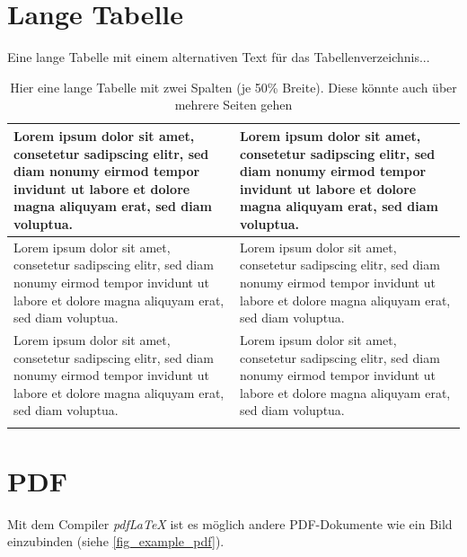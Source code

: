\section{Lange Tabelle}
Eine lange Tabelle mit einem alternativen Text für das Tabellenverzeichnis...
\begin{longtable}{p{0.5\linewidth} p{0.5\linewidth}}
    \hline
    Lorem ipsum dolor sit amet, consetetur sadipscing elitr, sed diam nonumy eirmod tempor invidunt ut labore et dolore magna aliquyam erat, sed diam voluptua. &
    Lorem ipsum dolor sit amet, consetetur sadipscing elitr, sed diam nonumy eirmod tempor invidunt ut labore et dolore magna aliquyam erat, sed diam voluptua. \\
    \hline
    Lorem ipsum dolor sit amet, consetetur sadipscing elitr, sed diam nonumy eirmod tempor invidunt ut labore et dolore magna aliquyam erat, sed diam voluptua. &
    Lorem ipsum dolor sit amet, consetetur sadipscing elitr, sed diam nonumy eirmod tempor invidunt ut labore et dolore magna aliquyam erat, sed diam voluptua. \\
    \hline
    Lorem ipsum dolor sit amet, consetetur sadipscing elitr, sed diam nonumy eirmod tempor invidunt ut labore et dolore magna aliquyam erat, sed diam voluptua. &
    Lorem ipsum dolor sit amet, consetetur sadipscing elitr, sed diam nonumy eirmod tempor invidunt ut labore et dolore magna aliquyam erat, sed diam voluptua. \\
    \hline
\caption[Alternativer kürzerer Text für eine Caption]{Hier eine lange Tabelle mit zwei Spalten (je 50\% Breite). Diese könnte auch über mehrere Seiten gehen}
\label{tbl_longtable}
\end{longtable}

\section{PDF}
Mit dem Compiler \textit{pdfLaTeX} ist es möglich andere PDF-Dokumente wie ein Bild einzubinden (siehe \ref{fig_example_pdf}).

